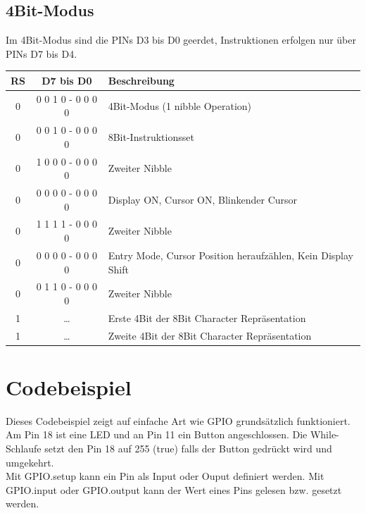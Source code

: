\documentclass[a4paper,11pt]{article}
\begin{document}
\subsection*{4Bit-Modus}
Im 4Bit-Modus sind die PINs D3 bis D0 geerdet, Instruktionen erfolgen nur über PINs D7 bis D4.
\begin{tabular}{| c | c | l |}
	\hline
	\textbf{RS} & \textbf{D7 bis D0} & \textbf{Beschreibung} \\\hline
	0 & 0 0 1 0 - 0 0 0 0 & 4Bit-Modus (1 nibble Operation)\\\hline
	0 & 0 0 1 0 - 0 0 0 0 & 8Bit-Instruktionsset \\\hline
	0 & 1 0 0 0 - 0 0 0 0 & Zweiter Nibble \\\hline
	
	0 & 0 0 0 0 - 0 0 0 0 & Display ON, Cursor ON, Blinkender Cursor\\\hline
	0 & 1 1 1 1 - 0 0 0 0 & Zweiter Nibble \\\hline
	
	0 & 0 0 0 0 - 0 0 0 0 &  Entry Mode, Cursor Position heraufzählen, Kein Display Shift\\\hline
	0 & 0 1 1 0 - 0 0 0 0 & Zweiter Nibble \\\hline
		
	
	
	1 & \ldots & Erste 4Bit der 8Bit Character Repräsentation \\\hline
	1 & \ldots & Zweite 4Bit der 8Bit Character Repräsentation \\\hline
\end{tabular}

\newpage

\section*{Codebeispiel}
Dieses Codebeispiel zeigt auf einfache Art wie GPIO grundsätzlich funktioniert. Am Pin 18 ist eine LED und an Pin 11 ein Button angeschlossen.
Die While-Schlaufe setzt den Pin 18 auf 255 (true) falls der Button gedrückt wird und umgekehrt.\\


Mit GPIO.setup kann ein Pin als Input oder Ouput definiert werden. Mit GPIO.input oder GPIO.output kann der Wert eines Pins gelesen bzw. gesetzt werden.
\end{document}
